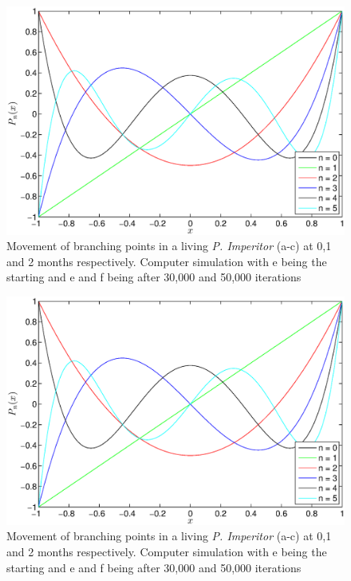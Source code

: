 \documentclass[]{article}
\begin{document}
\begin{figure}
\centering
\includegraphics[width=\textwidth]{LegendrePolynomials.eps}
\caption{Movement of branching points in a living \emph{P. Imperitor} (a-c) at 0,1 and 2 months respectively.
Computer simulation with e being the starting and e and f being after 30,000 and 50,000 iterations \label{branching}}
\end{figure}

\begin{figure}
\centering
\includegraphics[width=\textwidth]{LegendrePolynomials.eps}
\caption{Movement of branching points in a living \emph{P. Imperitor} (a-c) at 0,1 and 2 months respectively.
Computer simulation with e being the starting and e and f being after 30,000 and 50,000 iterations \label{branching}}
\end{figure}
\end{document}
